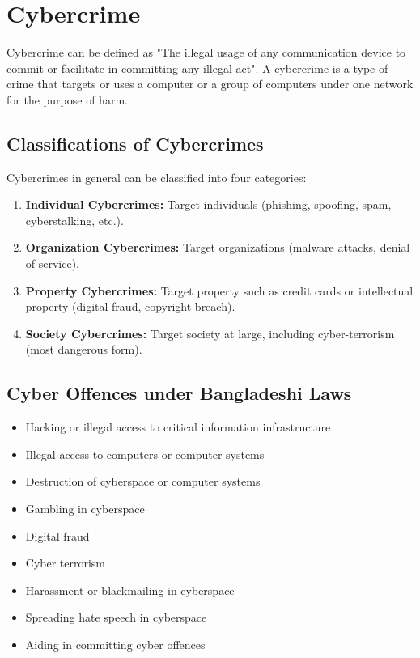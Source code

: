 \chapter{Cybercrime}

Cybercrime can be defined as "The illegal usage of any communication device to commit or facilitate in committing any illegal act". A cybercrime is a type of crime that targets or uses a computer or a group of computers under one network for the purpose of harm.


\section{Classifications of Cybercrimes}
Cybercrimes in general can be classified into four categories:
\begin{enumerate}[itemsep=0.3em, topsep=-0.5em]
   \item \textbf{Individual Cybercrimes:} Target individuals (phishing, spoofing, spam, cyberstalking, etc.).
   \item \textbf{Organization Cybercrimes:} Target organizations (malware attacks, denial of service).
   \item \textbf{Property Cybercrimes:} Target property such as credit cards or intellectual property (digital fraud, copyright breach).
   \item \textbf{Society Cybercrimes:} Target society at large, including cyber-terrorism (most dangerous form).
\end{enumerate}

\section{Cyber Offences under Bangladeshi Laws}
\begin{itemize}[parsep=0.3em]
    \item Hacking or illegal access to critical information infrastructure
    \item Illegal access to computers or computer systems
    \item Destruction of cyberspace or computer systems
    \item Gambling in cyberspace
    \item Digital fraud
    \item Cyber terrorism
    \item Harassment or blackmailing in cyberspace
    \item Spreading hate speech in cyberspace
    \item Aiding in committing cyber offences
\end{itemize}

